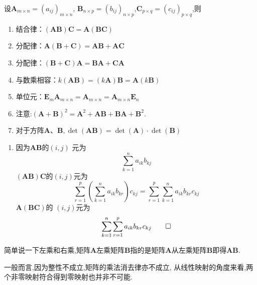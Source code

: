  \begin{formal}
 \begin{proposition}[矩阵乘法的性质]\label{prop:矩阵乘法的性质}
    设$\bm{A}_{m \times n} =
 \left(a_{ij}\right)_{m \times n}$,
 $\bm{B}_{n \times p} = \left(
    b_{ij}
 \right)_{n \times p}$,$\bm{C}
 _{p \times q} = \left(
    c_{ij}
 \right)_{p \times q}$,则
\begin{enumerate}[label=\textup{(\arabic*)}]
    \item 结合律：$\left(\bm{A}\bm{B}\right)\bm{C} = \bm{A}\left(\bm{B}\bm{C}\right) $
    \item 分配律：$\bm{A}\left(\bm{B} + \bm{C}\right) = \bm{A}\bm{B} + \bm{A}\bm{C} $
    \item 分配律：$\left(\bm{B}+\bm{C}\right)\bm{A}=\bm{B}\bm{A}+\bm{C}\bm{A} $
    \item 与数乘相容：$k\left(\bm{A}\bm{B}\right) = 
    \left(k\bm{A}\right)\bm{B}
     = \bm{A}\left(k\bm{B}\right)$
    \item 单位元：$
    \bm{E}_m \bm{A}_{m \times n} =
     \bm{A}_{m \times n} =
     \bm{A}_{m \times n}\bm{E}_{n} $
    \item 注意:$\left(\bm{A}+\bm{B}\right)^2=
    \bm{A}^2+\bm{A}\bm{B}+\bm{B}
    \bm{A}+\bm{B}^2.$
    \item 对于方阵$\bm{A}\text{、}
    \bm{B}, \det\left(
        \bm{AB}
    \right) =  \det\left(\bm{A}\right)
    \cdot  \det\left(\bm{B}\right)$
\end{enumerate}
 \end{proposition}
 \begin{Proof}

 \begin{enumerate}[label=\textup{(\arabic*)}]
    \item 因为$\bm{AB}$的$\left(i,j\right)$
 元为
 \[
 \sum_{k = 1}^{n}a_{ik}b_{kj}
 \]
 $\left(\bm{AB}\right)\bm{C}$的$
 \left(i,j\right)$元为
 \[
 \sum_{r = 1}^{p}\left(\sum_{k = 1}
 ^{n}a_{ik}b_{kr}\right)c_{kj}
 =
 \sum_{r = 1}^{p}\sum_{k = 1}
 ^{n}a_{ik}b_{kr}c_{kj}
 \]
 $\bm{A}\left(\bm{BC}\right)$的
 $\left(i,j\right)$元为
 \[
 \sum_{k = 1}^{n}\sum_{r = 1}
 ^{p}a_{ik}b_{kr}c_{kj}\qedhere
 \]
 \end{enumerate}
 \end{Proof}
 \end{formal}
 \vfill
\begin{red}
\begin{remark}
    简单说一下左乘和右乘,矩阵$\bm{A}$左乘矩阵$\bm{B}$指的是矩阵$\bm{A}$从左乘矩阵$\bm{B}$即得$\bm{AB}$.
\end{remark}
\end{red}
\begin{red}
\begin{remark}
    一般而言,因为整性不成立,矩阵的乘法消去律亦不成立,
    从线性映射的角度来看,两个非零映射符合得到零映射也并非不可能.
\end{remark}
\end{red}
